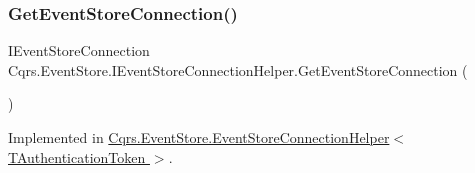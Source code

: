 \subsubsection{\texorpdfstring{Get\+Event\+Store\+Connection()}{GetEventStoreConnection()}}
{\footnotesize\ttfamily I\+Event\+Store\+Connection Cqrs.\+Event\+Store.\+I\+Event\+Store\+Connection\+Helper.\+Get\+Event\+Store\+Connection (\begin{DoxyParamCaption}{ }\end{DoxyParamCaption})}



Implemented in \hyperlink{classCqrs_1_1EventStore_1_1EventStoreConnectionHelper_a36c7ef0505319af9f8ae02da0050ab30_a36c7ef0505319af9f8ae02da0050ab30}{Cqrs.\+Event\+Store.\+Event\+Store\+Connection\+Helper$<$ T\+Authentication\+Token $>$}.

